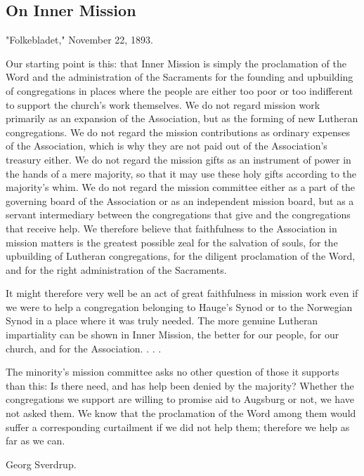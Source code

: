 
\subsection{On Inner Mission}

"Folkebladet," November 22, 1893.

Our starting point is this: that Inner Mission is simply the proclamation of the Word and the administration of the Sacraments for the founding and upbuilding of congregations in places where the people are either too poor or too indifferent to support the church’s work themselves. We do not regard mission work primarily as an expansion of the Association, but as the forming of new Lutheran congregations. We do not regard the mission contributions as ordinary expenses of the Association, which is why they are not paid out of the Association’s treasury either. We do not regard the mission gifts as an instrument of power in the hands of a mere majority, so that it may use these holy gifts according to the majority’s whim. We do not regard the mission committee either as a part of the governing board of the Association or as an independent mission board, but as a servant intermediary between the congregations that give and the congregations that receive help. We therefore believe that faithfulness to the Association in mission matters is the greatest possible zeal for the salvation of souls, for the upbuilding of Lutheran congregations, for the diligent proclamation of the Word, and for the right administration of the Sacraments.

It might therefore very well be an act of great faithfulness in mission work even if we were to help a congregation belonging to Hauge’s Synod or to the Norwegian Synod in a place where it was truly needed. The more genuine Lutheran impartiality can be shown in Inner Mission, the better for our people, for our church, and for the Association. . . .

The minority’s mission committee asks no other question of those it supports than this: Is there need, and has help been denied by the majority? Whether the congregations we support are willing to promise aid to Augsburg or not, we have not asked them. We know that the proclamation of the Word among them would suffer a corresponding curtailment if we did not help them; therefore we help as far as we can.

Georg Sverdrup.

